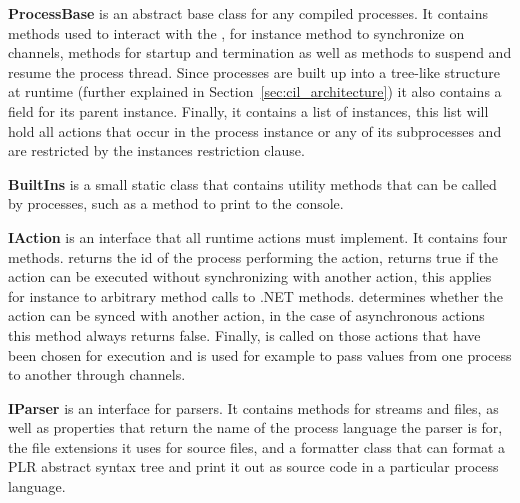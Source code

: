 	\textbf{ProcessBase} is an abstract base class for any compiled processes.
	It contains methods used to interact with the ,
	for instance method to synchronize on channels, methods for startup and
	termination as well as methods to suspend and resume the process thread.
	Since processes are built up into a tree-like structure at runtime (further 
	explained in Section~\ref{sec:cil_architecture}) it also contains a field 
	for its parent  instance. Finally, it contains a list of 
	 instances, this list will hold all actions that occur in 
	the process instance or any of its subprocesses and are restricted by the 
	instances restriction clause.
	
	\textbf{BuiltIns} is a small static class that contains utility methods
	that can be called by processes, such as a method to print to the console.
	
	\textbf{IAction} is an interface that all runtime actions must implement.
	It contains four methods.  returns the id of the
	process performing the action,  returns true if
	the action can be executed without synchronizing with another action, 
	this applies for instance to arbitrary method calls to .NET methods.
	 determines whether the action can be 
	synced with another action, in the case of asynchronous actions this
	method always returns false. Finally,  is 
	called on those actions that have been chosen for execution and is used
	for example to pass values from one process to another through channels.

	\textbf{IParser} is an interface for parsers. It contains 
	methods for streams and files, as well as properties that return the
	name of the process language the parser is for, the file extensions it
	uses for source files, and a formatter class that can format a PLR abstract
	syntax tree and print it out as source code in a particular process language.
	

